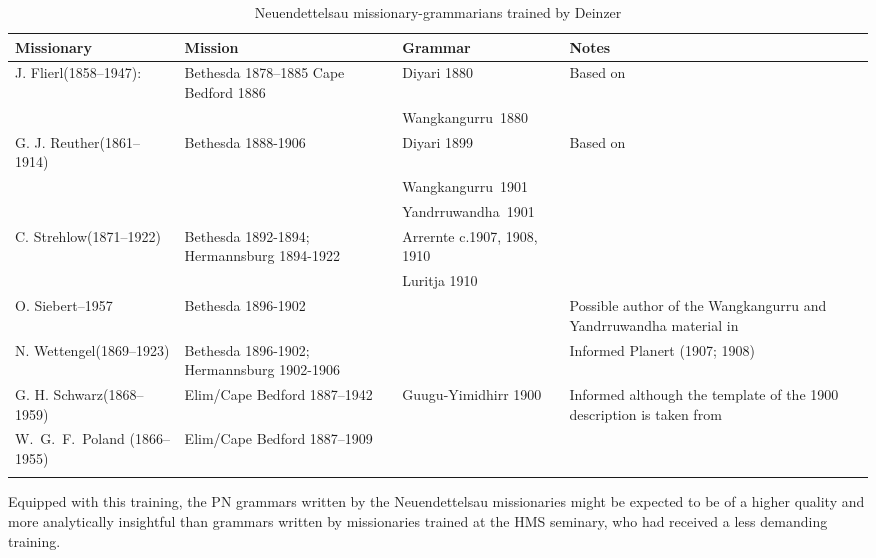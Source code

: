 \begin{table}
\small
\begin{tabularx}{\textwidth}{p{2.1cm}QQp{3.1cm}}
\lsptoprule
Missionary & Mission & Grammar & Notes \\
\midrule
J. Flierl\newline (1858--1947): & Bethesda 1878--1885 Cape {Bedford 1886} & Diyari 1880  & Based on \citet{koch_untitled_1868}\\&  & \mbox{Wangkangurru 1880} & \\
\tablevspace
G. J. Reuther\newline (1861--1914) & {Bethesda 1888}-1906 & Diyari 1899 & Based on \citet{koch_untitled_1868}\\
&  & \mbox{Wangkangurru 1901} & \\
 &  & \mbox{Yandrruwandha 1901} & \\
\tablevspace
C. Strehlow\newline (1871--1922) & {Bethesda 1892}-1894; {Hermannsburg  1894}-1922 & Arrernte c.1907, 1908, 1910 & \\
&  & Luritja 1910 & \\
\tablevspace
O. Siebert--1957 & {Bethesda 1896}-1902 &  & Possible author of the Wangkangurru and Yandrruwandha  material in \citet{reuther_three_1981}\\
\tablevspace
N. Wettengel\newline (1869--1923) & {Bethesda 1896}-1902; Hermannsburg 1902-1906 &  & Informed Planert (1907; 1908)\\
\tablevspace
G. H. Schwarz\newline (1868--1959) & Elim/Cape Bedford 1887--1942 &  Guugu-Yimidhirr 1900 & Informed \citet{roth_structure_1901} although the template of the 1900 description is taken from \citet{roth_ethnological_1897}\\
\tablevspace
\mbox{W. G. F. Poland} (1866--1955) & Elim/Cape Bedford 1887--1909 &  & \\
\lspbottomrule
\end{tabularx}
\caption{Neuendettelsau missionary-grammarians trained by Deinzer}
\label{bkm:Ref449375740}\label{tab:key:157}
\end{table}

Equipped with this training, the PN grammars written by the Neuendettelsau missionaries might be expected to be of a higher quality and more analytically insightful than grammars written by missionaries trained at the HMS seminary, who had received a less demanding training.

